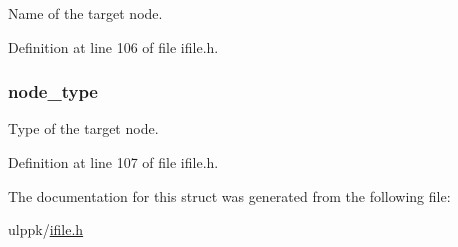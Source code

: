 Name of the target node. 



Definition at line 106 of file ifile.\-h.

\hypertarget{struct_i_f___f_i_l_t_e_r___s_p_e_c_a34ffe3d3db8e7b7cece8b906af93eabc}{
\subsubsection[{node\-\_\-type}]{ node\-\_\-type}}\label{struct_i_f___f_i_l_t_e_r___s_p_e_c_a34ffe3d3db8e7b7cece8b906af93eabc}


Type of the target node. 



Definition at line 107 of file ifile.\-h.



The documentation for this struct was generated from the following file\-:\begin{DoxyCompactItemize}
\item 
ulppk/\hyperlink{ifile_8h}{ifile.\-h}\end{DoxyCompactItemize}
